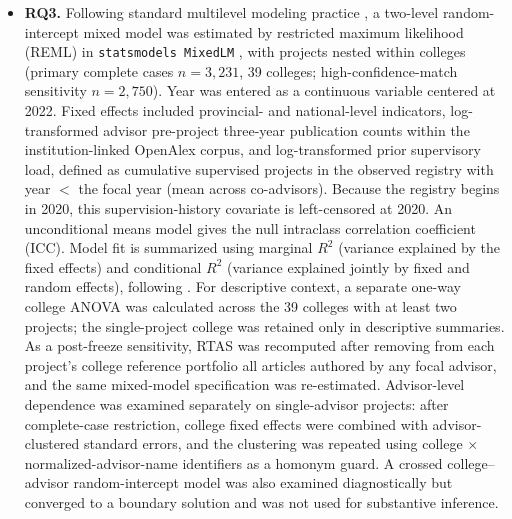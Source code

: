 \documentclass[11pt]{article}
\begin{document}
\begin{itemize}
\item \textbf{RQ3.} Following standard multilevel modeling practice \citep{snijders2012multilevel}, a two-level random-intercept mixed model was estimated by restricted maximum likelihood (REML) in \texttt{statsmodels MixedLM} \citep{seabold2010statsmodels}, with projects nested within colleges (primary complete cases $n=3,231$, 39 colleges; high-confidence-match sensitivity $n=2,750$). Year was entered as a continuous variable centered at 2022. Fixed effects included provincial- and national-level indicators, log-transformed advisor pre-project three-year publication counts within the institution-linked OpenAlex corpus, and log-transformed prior supervisory load, defined as cumulative supervised projects in the observed registry with year $<$ the focal year (mean across co-advisors). Because the registry begins in 2020, this supervision-history covariate is left-censored at 2020. An unconditional means model gives the null intraclass correlation coefficient (ICC). Model fit is summarized using marginal $R^2$ (variance explained by the fixed effects) and conditional $R^2$ (variance explained jointly by fixed and random effects), following \citet{nakagawa2017r2}. For descriptive context, a separate one-way college ANOVA was calculated across the 39 colleges with at least two projects; the single-project college was retained only in descriptive summaries. As a post-freeze sensitivity, RTAS was recomputed after removing from each project's college reference portfolio all articles authored by any focal advisor, and the same mixed-model specification was re-estimated. Advisor-level dependence was examined separately on single-advisor projects: after complete-case restriction, college fixed effects were combined with advisor-clustered standard errors, and the clustering was repeated using college $\times$ normalized-advisor-name identifiers as a homonym guard. A crossed college--advisor random-intercept model was also examined diagnostically but converged to a boundary solution and was not used for substantive inference.


\end{itemize}
\end{document}
